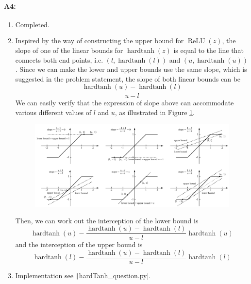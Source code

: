 \documentclass[12pt]{article}
\newcommand{\relu}[1]{\operatorname{ReLU}\left(#1\right)}
\newcommand{\hardtanh}[1]{\operatorname{hardtanh}\left(#1\right)}
\begin{document}
\paragraph{A4:}
\begin{enumerate}[1.]
\item Completed.

\item Inspired by the way of constructing the upper bound for $\relu{z}$, the slope of one of the linear bounds for $\hardtanh{z}$ is equal to the line that connects both end points, i.e. $(l, \hardtanh{l})$ and $(u, \hardtanh{u})$. Since we can make the lower and upper bounds use the same slope, which is suggested in the problem statement, the slope of both linear bounds can be
	\begin{equation}
		\frac{\hardtanh{u} - \hardtanh{l}}{u - l}
	\end{equation}
	We can easily verify that the expression of slope above can accommodate various different values of $l$ and $u$, as illustrated in Figure \ref{fig:crown}.
	\begin{figure}[H]
		\centering
		\includegraphics[width=\linewidth]{crown}
		\caption{}
		\label{fig:crown}
	\end{figure}
	
	Then, we can work out the interception of the lower bound is
	\begin{equation}
		\hardtanh{u} - \frac{\hardtanh{u} - \hardtanh{l}}{u - l} \hardtanh{u}
	\end{equation}
	and the interception of the upper bound is
	\begin{equation}
		\hardtanh{l} - \frac{\hardtanh{u} - \hardtanh{l}}{u - l} \hardtanh{l}
	\end{equation}

\item Implementation see \texttt|hardTanh_question.py|.


\end{enumerate}
\end{document}
